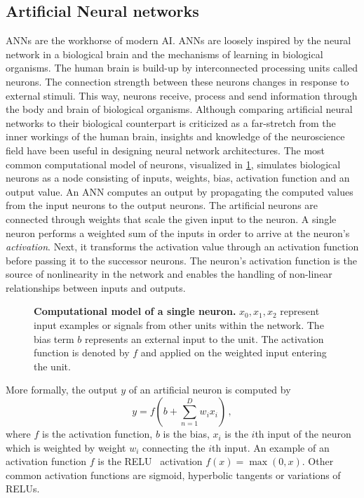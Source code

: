 \subsection{Artificial Neural networks} \label{subsubsec:lit_dnn}

\Glspl{ANN} are the workhorse of modern \gls{AI}. \Glspl{ANN} are loosely inspired by the neural network in a biological brain and the mechanisms of learning in biological organisms. The human brain is build-up by interconnected processing units called neurons. The connection strength between these neurons changes in response to external stimuli. This way, neurons receive, process and send information through the body and brain of biological organisms. Although comparing artificial neural networks to their biological counterpart is criticized as a far-stretch from the inner workings of the human brain, insights and knowledge of the neuroscience field have been useful in designing neural network architectures. The most common computational model of neurons, visualized in \cref{fig:neuron}, simulates biological neurons as a node consisting of inputs, weights, bias, activation function and an output value. An \gls{ANN} computes an output by propagating the computed values from the input neurons to the output neurons. The artificial neurons are connected through weights that scale the given input to the neuron. A single neuron performs a weighted sum of the inputs in order to arrive at the neuron's \textit{activation}. Next, it transforms the activation value through an activation function before passing it to the successor neurons. The neuron's activation function is the source of nonlinearity in the network and enables the handling of non-linear relationships between inputs and outputs.

\begin{figure}[htbp]
	\centering
	
	\caption[Computational model of a single neuron.]{\textbf{ Computational model of a single neuron.} $x_0, x_1, x_2$ represent input examples or signals from other units within the network. The bias term $b$ represents an external input to the unit. The activation function is denoted by $f$ and applied on the weighted input entering the unit.}
	\label{fig:neuron}
\end{figure}

More formally, the output $y$ of an artificial neuron is computed by
\begin{equation}\label{eq:neuron}
	y = f\left(b + \sum_{n = 1}^{D} w_i x_i \right)\,,
\end{equation}
where $f$ is the activation function, $b$ is the bias, $x_i$ is the $i$th input of the neuron which is weighted by weight $w_i$ connecting the $i$th input. An example of an activation function $f$ is the \gls{RELU}~\autocite{glorot2011deep} activation $f(x) = \max(0, x)$. Other common activation functions are sigmoid, hyperbolic tangents or variations of \glspl{RELU}.

